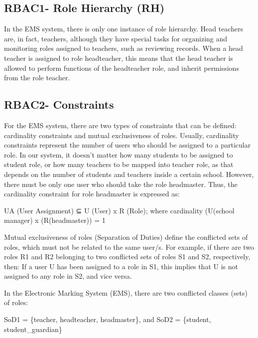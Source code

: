 \subsection{RBAC1- Role Hierarchy (RH)}
      In the EMS system, there is only one instance of role hierarchy.  Head teachers are, in fact, teachers, although they have special tasks for organizing and monitoring roles assigned to teachers, such as reviewing records.  When a head teacher is assigned to role headteacher, this means that the head teacher is allowed to perform functions of the headteacher role, and inherit permissions from the role teacher.

\subsection{RBAC2- Constraints}
For the EMS system, there are two types of constraints that can be defined: cardinality constraints and mutual exclusiveness of roles.  Usually, cardinality constraints represent the number of users who should be assigned to a particular role.  In our system, it doesn’t matter how many students to be assigned to student role, or how many teachers to be mapped into teacher role, as that depends on the number of students and teachers inside a certain school.  However, there must be only one user who should take the role headmaster.  Thus, the cardinality constraint for role headmaster is expressed as:

UA (User Assignment) ⊆  U (User) x R (Role); where
cardinality (U(school manager) x (R(headmaster)) = 1

Mutual exclusiveness of roles (Separation of Duties) define the conflicted sets of roles, which must not be related to the same user/s.  For example, if there are two roles R1 and R2 belonging to two conflicted sets of roles S1 and S2, respectively, then: If a user U has been assigned to a role in S1, this implies that U is not assigned to any role in S2, and vice versa.  

In the Electronic Marking System (EMS), there are two conflicted classes (sets) of roles:

SoD1 = \{teacher, headteacher, headmaster\}, and
SoD2 = \{student, student\_guardian\}

